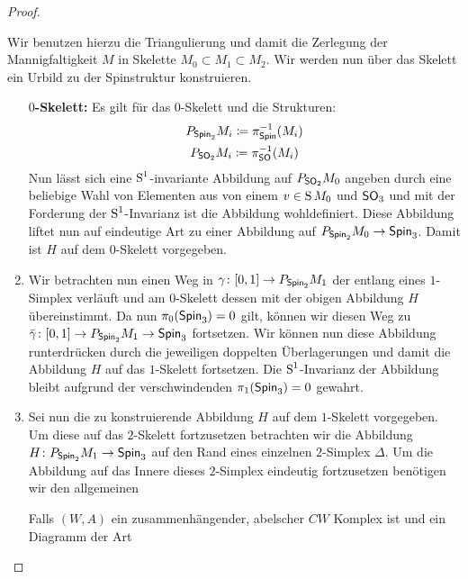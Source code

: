 \begin{Satz}
\begin{proof}
\begin{description}
		  Wir benutzen hierzu die Triangulierung und damit die Zerlegung
		  der Mannigfaltigkeit $ M $ in Skelette $ M_0\subset M_1\subset M_2 $.
		  Wir werden nun über das Skelett ein Urbild zu der Spinstruktur
		  konstruieren.
%		  
		  \begin{enumerate}
		  	\item[$ 0 ${\bfseries-Skelett:}] Es gilt für das $ 0 $-Skelett
		  	und die Strukturen:
			  	\begin{gather*}
			  		\Ph{\spin_2}{M_i} \coloneqq \pi^{-1}_{\spin}(M_i)\\
			  		\Ph{\so_2}{M_i} \coloneqq \pi^{-1}_{\so}(M_i)
			  	\end{gather*}
			  	Nun lässt sich eine $ \S^1 $-invariante Abbildung
			  auf $ \Ph{\so_2}{M_0} $ angeben durch eine beliebige Wahl
			  von Elementen aus von einem $ v\in \S M_0 $ und 
			  $ \so_3 $ und mit der Forderung der $ \S^1 $-Invarianz
			  ist die Abbildung wohldefiniert. Diese Abbildung
			  liftet nun auf eindeutige Art zu einer Abbildung auf
			  $ \Ph{\spin_2}{M_0} \to \spin_3$. Damit ist $ H $ auf dem
			  $ 0 $-Skelett vorgegeben.
		  	\item Wir betrachten nun einen Weg in $\abb{\gamma}{[0,1]}{\Ph{\spin_2}{M_1}} $ der entlang eines $ 1 $-Simplex
		  		verläuft und am $ 0 $-Skelett dessen mit der obigen Abbildung $ H $
		  		übereinstimmt. Da nun $ \pi_0(\spin_3)=0 $ gilt, können wir
		  		diesen Weg zu $ \bar{\gamma} \colon [0,1] \to \Ph{\spin_2}{M_1} \to \spin_3 $ fortsetzen. Wir können nun diese Abbildung runterdrücken
		  		durch die jeweiligen doppelten Überlagerungen und damit die
		  		Abbildung $ H $ auf das $ 1 $-Skelett fortsetzen. Die $ \S^1 $-Invarianz der Abbildung bleibt aufgrund der verschwindenden
		  		$ \pi_1(\spin_3)=0 $ gewahrt.
		  	\item Sei nun die zu konstruierende Abbildung $ H $ auf dem $ 1 $-Skelett
		  	vorgegeben. Um diese auf das $ 2 $-Skelett fortzusetzen betrachten
		  	wir die Abbildung $ \abb{H}{\Ph{\spin_2}{M_1}}{\spin_3} $ auf
		  	den Rand eines einzelnen $ 2 $-Simplex $ \Delta $. Um die Abbildung auf das Innere
		  	dieses $ 2 $-Simplex eindeutig fortzusetzen benötigen wir den 
		  	allgemeinen 
		  	\begin{Satz}
		  	Falls $ (W,A) $ ein zusammenhängender, abelscher $ CW $ Komplex ist und  ein Diagramm der Art
		  	\begin{center}
\end{center}
\end{Satz}
\end{enumerate}
\end{description}
\end{proof}
\end{Satz}
